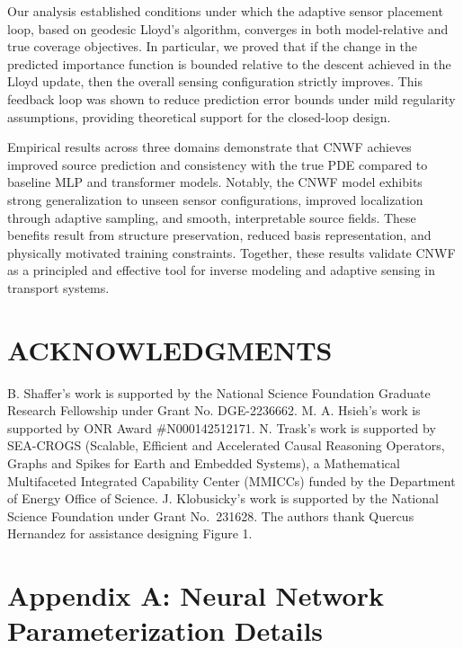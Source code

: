 \documentclass[onefignum,onetabnum]{siamart171218} %
\begin{document}
Our analysis established conditions under which the adaptive sensor placement loop, based on geodesic Lloyd’s algorithm, converges in both model-relative and true coverage objectives. In particular, we proved that if the change in the predicted importance function is bounded relative to the descent achieved in the Lloyd update, then the overall sensing configuration strictly improves. This feedback loop was shown to reduce prediction error bounds under mild regularity assumptions, providing theoretical support for the closed-loop design.

Empirical results across three domains demonstrate that CNWF achieves improved source prediction and consistency with the true PDE compared to baseline MLP and transformer models. Notably, the CNWF model exhibits strong generalization to unseen sensor configurations, improved localization through adaptive sampling, and smooth, interpretable source fields. These benefits result from structure preservation, reduced basis representation, and physically motivated training constraints. Together, these results validate CNWF as a principled and effective tool for inverse modeling and adaptive sensing in transport systems.


\section{ACKNOWLEDGMENTS}
B. Shaffer's work is supported by the National Science Foundation Graduate Research Fellowship under Grant No. DGE-2236662. M. A. Hsieh's work is supported by ONR Award \#N000142512171. N. Trask's work is supported by SEA-CROGS (Scalable, Efficient and Accelerated Causal Reasoning Operators, Graphs and Spikes for Earth and Embedded Systems), a Mathematical Multifaceted Integrated Capability Center (MMICCs) funded by the Department of Energy Office of Science. J. Klobusicky's work is supported by the National
Science Foundation under Grant No.\ 231628. The authors thank Quercus Hernandez for assistance designing Figure 1.  








\section*{Appendix A: Neural Network Parameterization Details}
\label{app:architecture}
\end{document}
